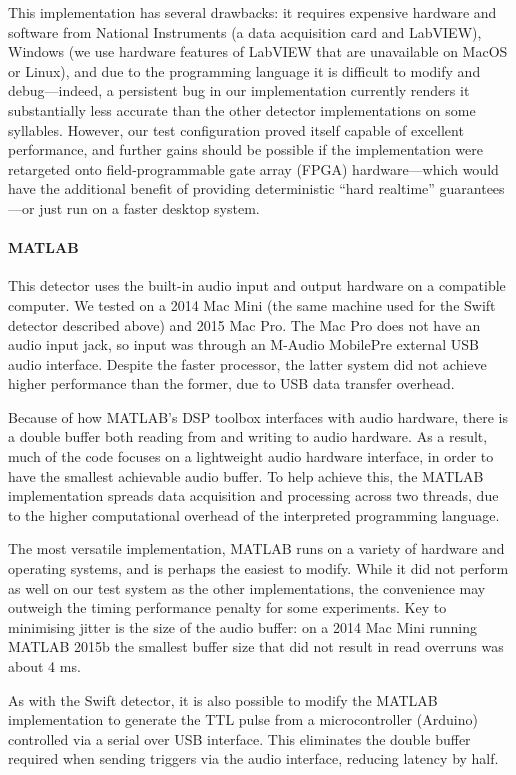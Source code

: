 \documentclass[10pt,letterpaper]{article}
\renewcommand{\subsubsection}[1]{\paragraph{#1}}
\begin{document}
This implementation has several drawbacks: it requires expensive hardware and software from National Instruments (a data acquisition card and LabVIEW), Windows (we use hardware features of LabVIEW that are unavailable on MacOS or Linux), and due to the programming language it
is difficult to modify and debug---indeed, a persistent bug in our
implementation currently renders it substantially less accurate than
the other detector implementations on some syllables. However, our
test configuration proved itself capable of excellent performance, and further
gains should be possible if the implementation were retargeted onto
field-programmable gate array (FPGA) hardware---which would have the additional benefit of providing
deterministic ``hard realtime'' guarantees---or just run on a faster
desktop system.

\subsubsection{MATLAB}

This detector uses the built-in audio input and output hardware on a
compatible computer.  We tested on a 2014 Mac Mini (the same machine used
for the Swift detector described above) and 2015 Mac Pro.
The Mac Pro does not have an audio input jack, so input was through an
M-Audio MobilePre external USB audio interface.  Despite the faster
processor, the latter system did not achieve higher performance than
the former, due to USB data transfer overhead.

Because of how MATLAB's DSP toolbox interfaces with audio hardware,
there is a double buffer both reading from and writing to audio
hardware. As a result, much of the code focuses on a lightweight audio
hardware interface, in order to have the smallest achievable audio
buffer. To help achieve this, the MATLAB implementation spreads data
acquisition and processing across two threads, due to the higher
computational overhead of the interpreted programming language.

The most versatile implementation, MATLAB runs on a variety of
hardware and operating systems, and is perhaps the easiest to modify.
While it did not perform as well on our test system as the other
implementations, the convenience may outweigh the timing
performance penalty for some experiments.  Key to minimising jitter is
the size of the audio buffer: on a 2014 Mac Mini running MATLAB 2015b
the smallest buffer size that did not result in read overruns was
about 4 ms.

As with the Swift detector, it is also possible to modify the
MATLAB implementation to generate the TTL pulse from a microcontroller
(Arduino) controlled via a serial over USB interface. This eliminates
the double buffer required when sending triggers via the audio
interface, reducing latency by half.
\end{document}
